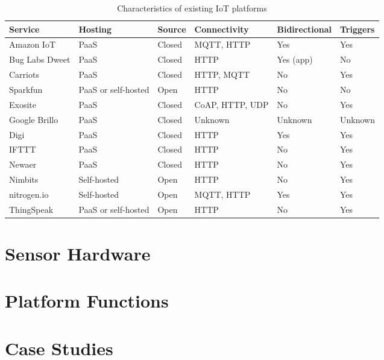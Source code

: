       \begin{table}
        \scriptsize
        \begin{tabular}{| p{2cm} | p{1.5cm}  | p{1cm}  | p{2cm}  | p{1.8cm}  | p{1.25cm}  |}
          \hline
          \textbf{Service} & \textbf{Hosting} & \textbf{Source} & \textbf{Connectivity} & \textbf{Bidirectional} & \textbf{Triggers} \\ \hline
          Amazon IoT & PaaS & Closed & MQTT, HTTP & Yes & Yes \\ \hline
          Bug Labs Dweet & PaaS & Closed & HTTP & Yes (app) & No \\ \hline
          Carriots & PaaS & Closed & HTTP, MQTT & No & Yes \\ \hline
          Sparkfun & PaaS or self-hosted & Open & HTTP & No & No \\ \hline
          Exosite & PaaS & Closed & CoAP, HTTP, UDP & No & Yes \\ \hline
          Google Brillo & PaaS & Closed & Unknown & Unknown & Unknown \\ \hline
          Digi & PaaS & Closed & HTTP & Yes & Yes \\ \hline
          IFTTT & PaaS & Closed & HTTP & No & Yes \\ \hline
          Newaer & PaaS & Closed & HTTP & No & Yes \\ \hline
          Nimbits & Self-hosted & Open & HTTP & No & Yes \\ \hline
          nitrogen.io & Self-hosted & Open & MQTT, HTTP & Yes & Yes \\ \hline
          ThingSpeak & PaaS or self-hosted & Open & HTTP & No & Yes \\ \hline
        \end{tabular}

        \caption{Characteristics of existing IoT platforms}\label{platform-characteristics}
      \end{table}
  \section{Sensor Hardware}
  \section{Platform Functions}
  \section{Case Studies}